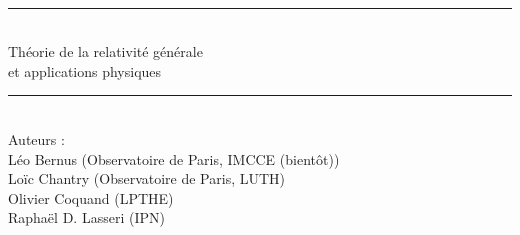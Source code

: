 \documentclass[french]{book} %
\newcommand{\HRule}{\rule{\linewidth}{0.5mm}}
\theoremstyle{plain}
\begin{document}
\begin{titlepage}
\begin{center}
\begin{minipage}[t]{0.3\textwidth}
\begin{flushright}
	  \end{flushright}
	\end{minipage}
	\\[1cm]


	\HRule \\[0.8cm]
	{\huge  Théorie de la relativité générale \\ et applications physiques }\\[0.4cm]
	\HRule \\[1cm]

	Auteurs : \\

	Léo Bernus (Observatoire de Paris, IMCCE (bientôt)) \\
	Loïc Chantry (Observatoire de Paris, LUTH) \\
	Olivier Coquand (LPTHE) \\
	Raphaël D. Lasseri (IPN)









\end{center}
\end{titlepage}
\end{document}

